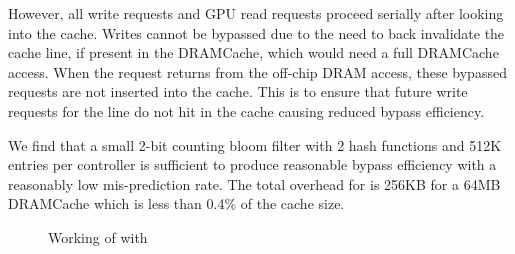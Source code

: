 \par However, all write requests and GPU read requests proceed serially after looking into the cache. Writes cannot be bypassed due to the need to back invalidate the cache line, if present in the DRAMCache, which would need a full DRAMCache access.
When the request returns from the off-chip DRAM access, these bypassed requests are not inserted into the cache. This is to ensure that future write requests for the line do not hit in the cache causing reduced bypass efficiency.
\par We find that a small 2-bit counting bloom filter with 2 hash functions and 512K entries per controller is sufficient to produce reasonable bypass efficiency with a reasonably low mis-prediction rate. The total overhead for \bypassname is 256KB for a 64MB DRAMCache which is less than 0.4\% of the cache size.

\begin{figure}[htb]
    \centering
    \bloom
    \caption{Working of \cachename with \bypassname }
    \label{fig:bye}
\end{figure}

